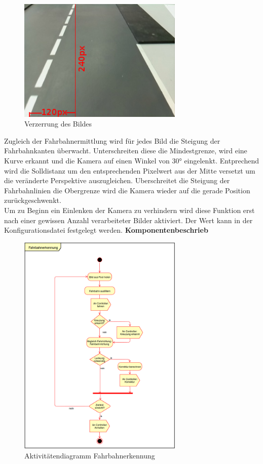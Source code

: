 \begin{figure}[H]%
\centering
\includegraphics[width=0.7\textwidth]{03_Loesungskonzept/pictures/Verzerrung.png}
\caption{Verzerrung des Bildes}
\label{fig:routeCorr}
\end{figure}
Zugleich der Fahrbahnermittlung wird für jedes Bild die Steigung der Fahrbahnkanten überwacht. Unterschreiten diese die Mindestgrenze, wird eine Kurve erkannt und die Kamera auf einen Winkel von 30° eingelenkt. Entprechend wird die Solldistanz um den entsprechenden Pixelwert aus der Mitte versetzt um die veränderte Perspektive auszugleichen. Uberschreitet die Steigung der Fahrbahnlinien die Obergrenze wird die Kamera wieder auf die gerade Position zurückgeschwenkt.\\
Um zu Beginn ein Einlenken der Kamera zu verhindern wird diese Funktion erst nach einer gewissen Anzahl verarbeiteter Bilder aktiviert. Der Wert kann in der Konfigurationsdatei festgelegt werden.
\newpage
\textbf{Komponentenbeschrieb}
\begin{figure}[H]%
\centering
\includegraphics[width=0.7\textwidth]{03_Loesungskonzept/pictures/Fahrbahnerkennung.png}
\caption{Aktivitätendiagramm Fahrbahnerkennung}
\label{fig:activityRoute}
\end{figure}
